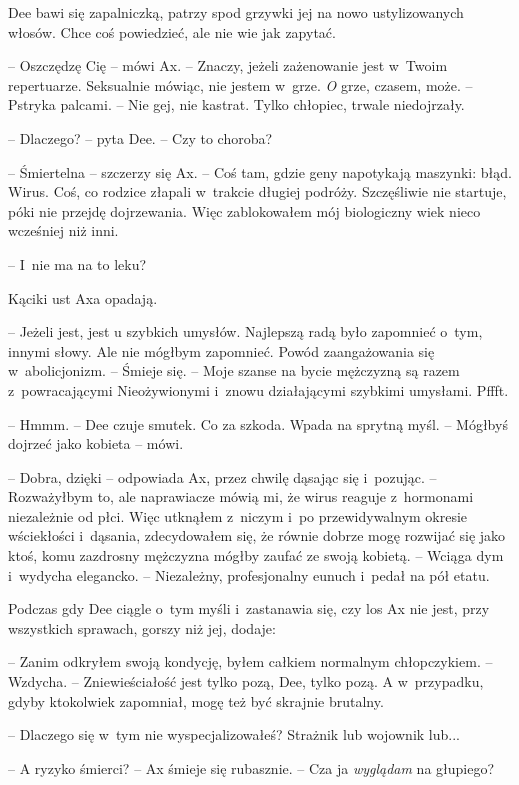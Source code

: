 \documentclass[oneside,polish,11pt,sfheadings]{mwbk}
\begin{document}
Dee bawi się zapalniczką, patrzy spod grzywki jej na nowo ustylizowanych
włosów. Chce coś powiedzieć, ale nie wie jak zapytać.

-- Oszczędzę Cię -- mówi Ax. -- Znaczy, jeżeli zażenowanie jest w~Twoim
repertuarze. Seksualnie mówiąc, nie jestem w~grze. \emph{O} grze,
czasem, może. -- Pstryka palcami. -- Nie gej, nie kastrat. Tylko chłopiec,
trwale niedojrzały.

-- Dlaczego? -- pyta Dee. -- Czy to choroba?

-- Śmiertelna -- szczerzy się Ax. -- Coś tam, gdzie geny napotykają
maszynki: błąd. Wirus. Coś, co rodzice złapali w~trakcie długiej
podróży. Szczęśliwie nie startuje, póki nie przejdę dojrzewania. Więc
zablokowałem mój biologiczny wiek nieco wcześniej niż inni.

-- I~nie ma na to leku?

Kąciki ust Axa opadają. 

-- Jeżeli jest, jest u szybkich umysłów.
Najlepszą radą było zapomnieć o~tym, innymi słowy. Ale nie mógłbym
zapomnieć. Powód zaangażowania się w~abolicjonizm. -- Śmieje się. -- Moje
szanse na bycie mężczyzną są razem z~powracającymi Nieożywionymi i~znowu
działającymi szybkimi umysłami. Pffft.

-- Hmmm. -- Dee czuje smutek. Co za szkoda. Wpada na sprytną myśl. -- Mógłbyś dojrzeć jako kobieta -- mówi.

-- Dobra, dzięki -- odpowiada Ax, przez chwilę dąsając się i~pozując. -- Rozważyłbym to, ale naprawiacze mówią mi, że wirus reaguje z~hormonami
niezależnie od płci. Więc utknąłem z~niczym i~po przewidywalnym okresie
wściekłości i~dąsania, zdecydowałem się, że równie dobrze mogę rozwijać
się jako ktoś, komu zazdrosny mężczyzna mógłby zaufać ze swoją kobietą.
-- Wciąga dym i~wydycha elegancko. -- Niezależny, profesjonalny eunuch i~pedał na pół etatu.

Podczas gdy Dee ciągle o~tym myśli i~zastanawia się, czy los Ax nie
jest, przy wszystkich sprawach, gorszy niż jej, dodaje:

-- Zanim odkryłem swoją kondycję, byłem całkiem normalnym chłopczykiem. -- Wzdycha. -- Zniewieściałość jest tylko pozą, Dee, tylko pozą. A w~przypadku, gdyby ktokolwiek zapomniał, mogę też być skrajnie brutalny.

-- Dlaczego się w~tym nie wyspecjalizowałeś? Strażnik lub wojownik lub...

-- A ryzyko śmierci? -- Ax śmieje się rubasznie. -- Cza ja \emph{wyglądam}
na głupiego?
\end{document}
